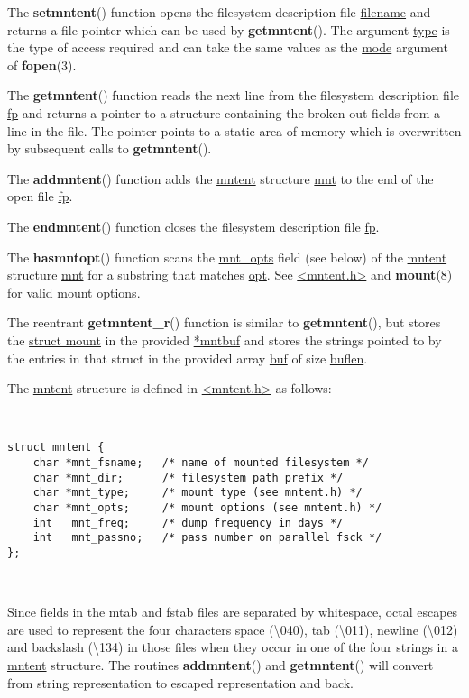 \documentclass[]{article}
\let\realtextbf=\textbf
\renewcommand{\textbf}[1]{\textcolor{boldcolor}{\realtextbf{#1}}}
\renewcommand{\emph}[1]{\underline{#1}}
\begin{document}
The \textbf{setmntent}() function opens the filesystem description file
\emph{filename} and returns a file pointer which can be used by
\textbf{getmntent}(). The argument \emph{type} is the type of access
required and can take the same values as the \emph{mode} argument of
\textbf{fopen}(3).

The \textbf{getmntent}() function reads the next line from the
filesystem description file \emph{fp} and returns a pointer to a
structure containing the broken out fields from a line in the file. The
pointer points to a static area of memory which is overwritten by
subsequent calls to \textbf{getmntent}().

The \textbf{addmntent}() function adds the \emph{mntent} structure
\emph{mnt} to the end of the open file \emph{fp}.

The \textbf{endmntent}() function closes the filesystem description file
\emph{fp}.

The \textbf{hasmntopt}() function scans the \emph{mnt\_opts} field (see
below) of the \emph{mntent} structure \emph{mnt} for a substring that
matches \emph{opt}. See \emph{\textless{}mntent.h\textgreater{}} and
\textbf{mount}(8) for valid mount options.

The reentrant \textbf{getmntent\_r}() function is similar to
\textbf{getmntent}(), but stores the \emph{struct mount} in the provided
\emph{*mntbuf} and stores the strings pointed to by the entries in that
struct in the provided array \emph{buf} of size \emph{buflen}.

The \emph{mntent} structure is defined in
\emph{\textless{}mntent.h\textgreater{}} as follows:

~

\begin{verbatim}
struct mntent {
    char *mnt_fsname;   /* name of mounted filesystem */
    char *mnt_dir;      /* filesystem path prefix */
    char *mnt_type;     /* mount type (see mntent.h) */
    char *mnt_opts;     /* mount options (see mntent.h) */
    int   mnt_freq;     /* dump frequency in days */
    int   mnt_passno;   /* pass number on parallel fsck */
};
\end{verbatim}

~

Since fields in the mtab and fstab files are separated by whitespace,
octal escapes are used to represent the four characters space
(\textbackslash{}040), tab (\textbackslash{}011), newline
(\textbackslash{}012) and backslash (\textbackslash{}134) in those files
when they occur in one of the four strings in a \emph{mntent} structure.
The routines \textbf{addmntent}() and \textbf{getmntent}() will convert
from string representation to escaped representation and back.
\end{document}
